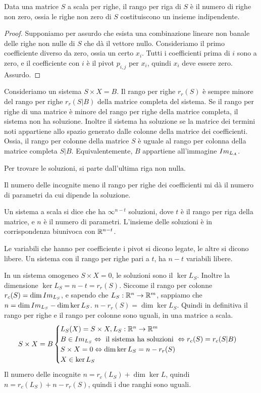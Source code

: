 \begin{prop}
Data una matrice $S$ a scala per righe, il rango per riga di $S$ \`e il numero di righe non zero, ossia le righe non zero di $S$ costituiscono un insieme indipendente. 
\end{prop}
\begin{proof}
Supponiamo per assurdo che esista una combinazione lineare non banale delle righe non nulle di $S$ che d\`a il vettore nullo. Consideriamo il primo coefficiente diverso da zero, ossia un certo $x_i$. Tutti i coefficienti prima di $i$ sono a zero, e il coefficiente con $i$ \`e il pivot $p_{i,j}$ per $x_i$, quindi $x_i$ deve essere zero. Assurdo.
\end{proof}

Consideriamo un sistema $S \times X = B$. Il rango per righe $r_r (S)$ \`e sempre minore del rango per righe $r_r (S | B)$ della matrice completa del sistema. Se il rango per righe di una matrice \`e minore del rango per righe della matrice completa, il sistema non ha soluzione. Inoltre il sistema ha soluzione se la matrice dei termini noti appartiene allo spazio generato dalle colonne della matrice dei coefficienti. Ossia, il rango per colonne della matrice $S$ \`e uguale al rango per colonna della matrice completa $S | B$. Equivalentemente, $B$ appartiene all'immagine $Im_{L_A}$.

Per trovare le soluzioni, si parte dall'ultima riga non nulla.

Il numero delle incognite meno il rango per righe dei coefficienti mi d\`a il numero di parametri da cui dipende la soluzione. 

Un sistema a scala si dice che ha $\infty^{n - t}$ soluzioni, dove $t$ \`e il rango per riga della matrice, e $n$ \`e il numero di parametri. L'insieme delle soluzioni \`e in corrispondenza biunivoca con $\mathbb{R}^{n - t}$.

Le variabili che hanno per coefficiente i pivot si dicono legate, le altre si dicono libere. Un sistema con il rango per righe pari a $t$, ha $n - t$ variabili libere.

In un sistema omogeneo $S \times X = 0$, le soluzioni sono il $\ker L_S$. Inoltre la dimensione $\ker L_S = n - t = r_r (S)$. Siccome il rango per colonne $r_c (S) = \dim Im_{L_S}$, e sapendo che $L_S : \mathbb{R}^n \to \mathbb{R}^m$, sappiamo che $n = \dim Im_{L_S} - \dim \ker L_S$. $n - r_r(S) = \dim \ker L_S$. Quindi in definitiva il rango per righe e il rango per colonne sono uguali, in una matrice a scala.
\[
S \times X = B 
\begin{cases}
L_S (X) = S \times X , L_S : \mathbb{R}^n \to \mathbb{R}^m \\
B \in Im_{L_S} \Leftrightarrow \text{ il sistema ha soluzioni } \Leftrightarrow r_c(S) = r_c(S | B) \\
S \times X = 0 \Leftrightarrow \dim \ker L_S = n - r_r(S) \\
X \in \ker L_S
\end{cases}
\]
Il numero delle incognite $n = r_c (L_S) + \dim \ker L$, quindi $n = r_c(L_S) + n - r_r (S)$, quindi i due ranghi sono uguali.

